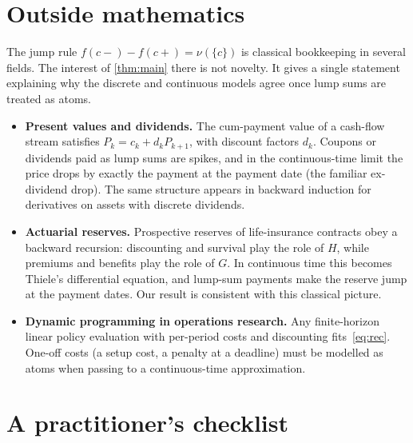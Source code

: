 \documentclass[11pt]{article}
\theoremstyle{plain}
\theoremstyle{remark}
\begin{document}
\section{Outside mathematics}\label{sec:outside}

The jump rule $f(c-)-f(c+)=\nu(\{c\})$ is classical bookkeeping in several fields. The
interest of \cref{thm:main} there is not novelty. It gives a single statement explaining why
the discrete and continuous models agree once lump sums are treated as atoms.
\begin{itemize}[leftmargin=1.4em]
  \item \textbf{Present values and dividends.} The cum-payment value of a cash-flow stream
  satisfies $P_k=c_k+d_kP_{k+1}$, with discount factors $d_k$. Coupons or dividends paid as
  lump sums are spikes, and in the continuous-time limit the price drops by exactly the
  payment at the payment date (the familiar ex-dividend drop). The same structure appears in
  backward induction for derivatives on assets with discrete dividends.
  \item \textbf{Actuarial reserves.} Prospective reserves of life-insurance contracts obey a
  backward recursion: discounting and survival play the role of $H$, while premiums and
  benefits play the role of $G$. In continuous time this becomes Thiele's differential
  equation, and lump-sum payments make the reserve jump at the payment dates. Our result is
  consistent with this classical picture.
  \item \textbf{Dynamic programming in operations research.} Any finite-horizon linear
  policy evaluation with per-period costs and discounting fits~\eqref{eq:rec}. One-off
  costs (a setup cost, a penalty at a deadline) must be modelled as atoms when passing to a
  continuous-time approximation.
\end{itemize}

\section{A practitioner's checklist}\label{sec:checklist}
\end{document}
